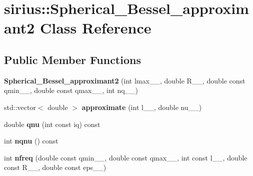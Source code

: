 \hypertarget{classsirius_1_1_spherical___bessel__approximant2}{}\section{sirius\+:\+:Spherical\+\_\+\+Bessel\+\_\+approximant2 Class Reference}
\label{classsirius_1_1_spherical___bessel__approximant2}
\subsection*{Public Member Functions}
\begin{DoxyCompactItemize}
\item 
\hypertarget{classsirius_1_1_spherical___bessel__approximant2_a5e67ce30c4bbc386925b6d466ef1ed79}{}{\bfseries Spherical\+\_\+\+Bessel\+\_\+approximant2} (int lmax\+\_\+\+\_\+, double R\+\_\+\+\_\+, double const qmin\+\_\+\+\_\+, double const qmax\+\_\+\+\_\+, int nq\+\_\+\+\_\+)\label{classsirius_1_1_spherical___bessel__approximant2_a5e67ce30c4bbc386925b6d466ef1ed79}

\item 
\hypertarget{classsirius_1_1_spherical___bessel__approximant2_aabd2db430c6a260691369c24c5d3d860}{}std\+::vector$<$ double $>$ {\bfseries approximate} (int l\+\_\+\+\_\+, double nu\+\_\+\+\_\+)\label{classsirius_1_1_spherical___bessel__approximant2_aabd2db430c6a260691369c24c5d3d860}

\item 
\hypertarget{classsirius_1_1_spherical___bessel__approximant2_a5f5e9866e2135bfa62ac243207db6b1c}{}double {\bfseries qnu} (int const iq) const \label{classsirius_1_1_spherical___bessel__approximant2_a5f5e9866e2135bfa62ac243207db6b1c}

\item 
\hypertarget{classsirius_1_1_spherical___bessel__approximant2_a8794047d0aa1626ca59e65bb789d4fec}{}int {\bfseries nqnu} () const \label{classsirius_1_1_spherical___bessel__approximant2_a8794047d0aa1626ca59e65bb789d4fec}

\item 
\hypertarget{classsirius_1_1_spherical___bessel__approximant2_abf1b92d06565ba986222eaf1ea3975a7}{}int {\bfseries nfreq} (double const qmin\+\_\+\+\_\+, double const qmax\+\_\+\+\_\+, int const l\+\_\+\+\_\+, double const R\+\_\+\+\_\+, double const eps\+\_\+\+\_\+)\label{classsirius_1_1_spherical___bessel__approximant2_abf1b92d06565ba986222eaf1ea3975a7}

\end{DoxyCompactItemize}
